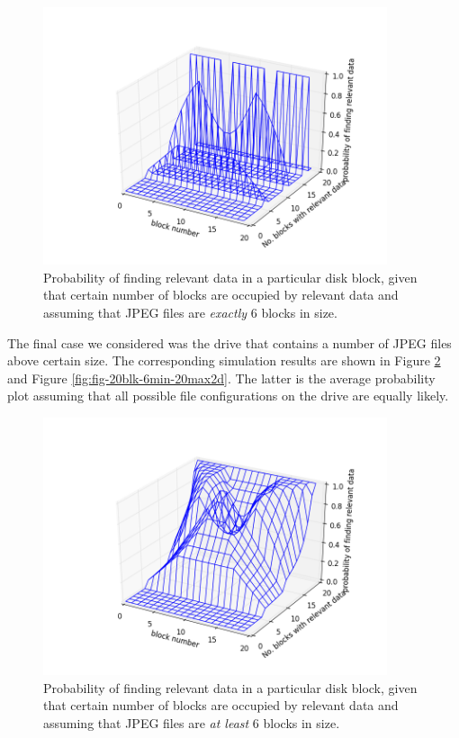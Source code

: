 \documentclass[final,5p,times,twocolumn,authoryear]{elsarticle}
\begin{document}
\begin{figure}
  \centerline{\includegraphics[width=0.9\textwidth]{fig-20blk-6min-6max3d}}
  \caption{Probability of finding relevant data in a particular disk block, given that certain number of blocks are occupied by relevant data and assuming that JPEG files are \emph{exactly} 6 blocks in size.}
  \label{fig:fig-20blk-6min-6max3d}
\end{figure}

The final case we considered was the drive that contains a number of JPEG files above certain size. The corresponding simulation results are shown in Figure \ref{fig:fig-20blk-6min-20max3d} and Figure \ref{fig:fig-20blk-6min-20max2d}. The latter is the average probability plot assuming that all possible file configurations on the drive are equally likely. 

\begin{figure}
  \centerline{\includegraphics[width=0.9\textwidth]{fig-20blk-6min-20max3d}}
  \caption{Probability of finding relevant data in a particular disk block, given that certain number of blocks are occupied by relevant data and assuming that JPEG files are \emph{at least} 6 blocks in size.}
  \label{fig:fig-20blk-6min-20max3d}
\end{figure}
\end{document}
